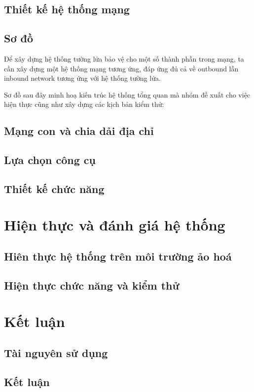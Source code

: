 \documentclass[12pt,titlepage,a4paper]{article}
\begin{document}
	\subsection{Thiết kế hệ thống mạng}
	\subsection{Sơ đồ}
	Để xây dựng hệ thống tường lửa bảo vệ cho một số thành phần trong mạng, ta cần xây dựng một hệ thống mạng tương ứng, đáp ứng đủ cả về outbound lẫn inbound network tương ứng với hệ thống tường lửa.
	\par
	Sơ đồ sau đây minh hoạ kiến trúc hệ thống tổng quan mà nhóm đề xuất cho việc hiện thực cũng như xây dựng các kịch bản kiểm thử:
	
	
	\subsection{Mạng con và chia dải địa chỉ}
	
	
	\subsection{Lựa chọn công cụ}
	\subsection{Thiết kế chức năng}
	\section{Hiện thực và đánh giá hệ thống}
	\subsection{Hiên thực hệ thống trên môi trường ảo hoá}
	\subsection{Hiện thực chức năng và kiểm thử}
	\section{Kết luận}
	\subsection{Tài nguyên sử dụng}
	\subsection{Kết luận}
	
\end{document}
